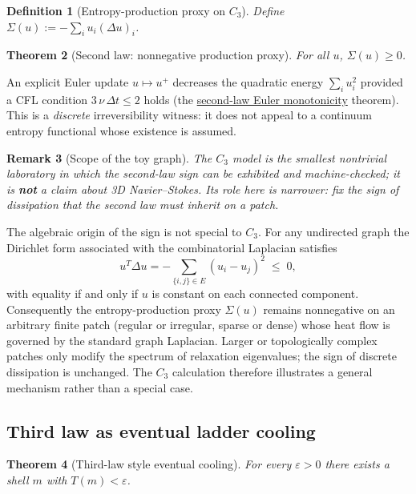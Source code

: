 \documentclass[11pt]{amsart}
\newtheorem{theorem}{Theorem}[section]
\newtheorem{definition}[theorem]{Definition}
\newtheorem{remark}[theorem]{Remark}
\begin{document}
\begin{definition}[Entropy-production proxy on $C_3$]
\label{def:entropy-prod}
Define $\Sigma(u):=-\sum_i u_i(\Delta u)_i$.
\end{definition}

\begin{theorem}[Second law: nonnegative production proxy]
\label{thm:second-sign}
For all $u$, $\Sigma(u)\ge 0$.
\end{theorem}

An explicit Euler update $u\mapsto u^+$ decreases the quadratic energy
$\sum_i u_i^2$ provided a CFL condition $3\,\nu\,\Delta t\le 2$ holds
(the \hyperref[lean:second-euler]{second-law Euler monotonicity} theorem).
This is a \emph{discrete} irreversibility witness: it does not appeal to a continuum
entropy functional whose existence is assumed.

\begin{remark}[Scope of the toy graph]
The $C_3$ model is the smallest nontrivial laboratory in which the second-law sign can
be exhibited and machine-checked; it is \textbf{not} a claim about 3D Navier--Stokes.
Its role here is narrower: fix the \emph{sign} of dissipation that the second law must
inherit on a patch.
\end{remark}

The algebraic origin of the sign is not special to $C_3$.  For any undirected graph the
Dirichlet form associated with the combinatorial Laplacian satisfies
\[
  u^T \Delta u = -\sum_{\{i,j\}\in E} (u_i - u_j)^2 \;\le\; 0,
\]
with equality if and only if $u$ is constant on each connected component.  Consequently
the entropy-production proxy $\Sigma(u)$ remains nonnegative on an arbitrary finite
patch (regular or irregular, sparse or dense) whose heat flow is governed by the
standard graph Laplacian.  Larger or topologically complex patches only modify the
spectrum of relaxation eigenvalues; the sign of discrete dissipation is unchanged.
The $C_3$ calculation therefore illustrates a general mechanism rather than a special
case.

\subsection{Third law as eventual ladder cooling}

\begin{theorem}[Third-law style eventual cooling]
\label{prop:third}
For every $\varepsilon>0$ there exists a shell $m$ with $T(m)<\varepsilon$.
\end{theorem}
\end{document}
